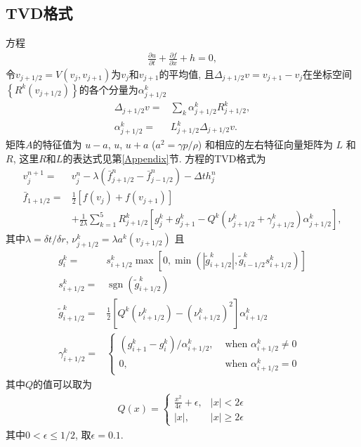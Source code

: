 \documentclass[10.5pt
]{article}
\begin{document}
\subsection{TVD格式}
方程
\begin{align}
\frac{\partial u}{\partial t}+\frac{\partial f}{\partial x}+h=0,
\end{align}
令$v_{j+1/2} = V(v_j, v_{j+1})$为$v_j$和$v_{j+1}$的平均值, 
且$\Delta_{j+1/2}v = v_{j+1} - v_j$在坐标空间$\left\{R^k \left(v_{j+1/2}\right)\right\}$的各个分量为$\alpha^{k} _{j+1/2}$
\begin{align}
\Delta_{j+1/2}v =& \sum_k \alpha^{k}_{j+1/2} R^{k}_{j+1/2},\\
\alpha^{k}_{j+1/2} =& L^{k}_{j+1/2} \Delta_{j+1/2}v.
\end{align}
矩阵$A$的特征值为 $u-a$, $u$, $u+a$ ($a^2 = \gamma p/\rho$) 和相应的左右特征向量矩阵为 $L$ 和 $R$, 这里$R$和$L$的表达式见第\ref{Appendix}节.
方程的TVD格式为\citep{Harten1983}
\begin{align}
v_{j}^{n+1}=&v_{j}^{n}-\lambda\left(\bar{f}_{j+1 / 2}^{n}-\bar{f}_{j-1 / 2}^{n}\right)-\Delta t h_{j}^{n}
\\
\bar{f}_{1+1 / 2}=&
\frac{1}{2}\left[f\left(v_{j}\right)+f\left(v_{j+1}\right)\right] \nonumber
\\ &+\frac{1}{2 \lambda} \sum_{k=1}^{5} R_{j+1 / 2}^{k}\left[g_{j}^{k}+g_{j+1}^{k}-Q^{k}\left(\nu_{j+1 / 2}^{k}+\gamma_{j+1 / 2}^{k}\right) \alpha_{j+1 / 2}^{k}\right],
\end{align}
其中$\lambda=\delta t/\delta r$, $\nu_{j+1 / 2}^{k}=\lambda a^k(v_{j+1/2})$ 且
\begin{align}
g_{i}^{k}=& s_{i+1 / 2}^{k} \max \left[0, \min \left(\left|\tilde{g}_{i+1 / 2}^{k}\right|, \tilde{g}_{i-1 / 2}^{k} s_{i+1 / 2}^{k}\right)\right] \\
s_{i+1 / 2}^{k}=&\operatorname{sgn}\left(\tilde{g}_{i+1 / 2}^{k}\right) \\ 
\tilde{g}_{i+1 / 2}^{k}=&\frac{1}{2}\left[Q^{k}\left(\nu_{i+1 / 2}^{k}\right)-\left(\nu_{i+1 / 2}^{k}\right)^{2}\right] \alpha_{i+1 / 2}^{k} \\ 
\gamma_{i+1 / 2}^{k}=&\left\{\begin{array}{ll}{\left(g_{i+1}^{k}-g_{i}^{k}\right) / \alpha_{i+1 / 2}^{k},} & {\text { when } \alpha_{i+1 / 2}^{k} \neq 0} \\ {0,} & {\text { when } \alpha_{i+1 / 2}^{k}=0}\end{array}\right.
\end{align}
其中$Q$的值可以取为
\begin{align}
Q(x)=\left\{\begin{array}{ll}{\frac{x^{2}}{4 \epsilon}+\epsilon,} & {|x|<2 \epsilon} \\ {|x|,} & {|x| \geq 2 \epsilon}\end{array}\right.
\end{align}
其中$0< \epsilon \leq 1/2$, 取$\epsilon=0.1$.
\end{document}
